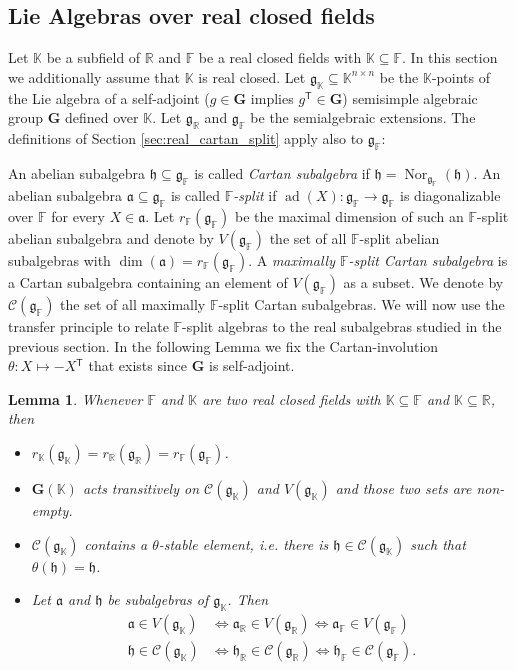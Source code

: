 \documentclass[12pt]{amsart}
\newcommand{\F}{\mathbb{F} }
\newcommand{\R}{\mathbb{R} }
\newcommand{\K}{\mathbb{K}}
\newcommand{\frakg}{\mathfrak{g}}
\newcommand{\fraka}{\mathfrak{a}}
\newcommand{\frakh}{\mathfrak{h}}
\newcommand{\bG}{\mathbf{G}}
\newcommand{\tran}{{^{\mathsf{T}}\!}}
\numberwithin{equation}{section}
\newtheorem{lemma}[theorem]{Lemma}
\theoremstyle{remark} %
\begin{document}
\subsection{Lie Algebras over real closed fields}

Let $\K$ be a subfield of $\R$ and $\F$ be a real closed fields with $\K \subseteq \F$. In this section we additionally assume that $\K$ is real closed. Let $\frakg_\K  \subseteq \K^{n\times n}$ be the $\K$-points of the Lie algebra of a self-adjoint ($g \in \bG$ implies $g\tran \in \bG$) semisimple algebraic group $\bG$ defined over $\K$. Let $\frakg_\R$ and $\frakg_\F$ be the semialgebraic extensions. The definitions of Section \ref{sec:real_cartan_split} apply also to $\frakg_\F$:

An abelian subalgebra $\frakh \subseteq \frakg_\F$ is called \emph{Cartan subalgebra} if $\frakh = \operatorname{Nor}_{\frakg_\F}(\frakh)$. An abelian subalgebra $\fraka \subseteq \frakg_\F$ is called \emph{$\F$-split} if $\operatorname{ad}(X) \colon \frakg_\F \to \frakg_\F$ is diagonalizable over $\F$ for every $X \in \fraka$. Let $r_{\F}(\frakg_\F)$ be the maximal dimension of such an $\F$-split abelian subalgebra and denote by $V(\frakg_\F)$ the set of all $\F$-split abelian subalgebras with $\dim(\fraka) = r_\F (\frakg_\F)$. A \emph{maximally $\F$-split Cartan subalgebra} is a Cartan subalgebra containing an element of $V(\frakg_\F)$ as a subset. We denote by $\mathcal{C}(\frakg_\F)$ the set of all maximally $\F$-split Cartan subalgebras. We will now use the transfer principle to relate $\F$-split algebras to the real subalgebras studied in the previous section. In the following Lemma we fix the Cartan-involution $\theta \colon X \mapsto -X\tran$ that exists since $\bG$ is self-adjoint.


\begin{lemma} \label{lem:3}
	Whenever $\F$ and $\K$ are two real closed fields with $\K \subseteq \F$ and $\K \subseteq \R$, then
	\begin{itemize}
		\item [(1)] $r_\K(\frakg_\K) = r_\R (\frakg_\R) =  r_\F (\frakg_\F)$.
		\item [(2)] $\bG(\K)$ acts transitively on $\mathcal{C}(\frakg_\K)$ and $V(\frakg_\K)$ and those two sets are non-empty.
		\item [(3)] \label{lem:3.3}$\mathcal{C}(\frakg_\K)$ contains a $\theta$-stable element, i.e. there is $\frakh \in \mathcal{C}(\frakg_\K)$ such that $\theta(\frakh) = \frakh$.
		\item [(4)] Let $\fraka$ and $\frakh$ be subalgebras of $\frakg_\K$. Then 
		\begin{align*}
			\fraka \in V(\frakg_\K) & \iff \fraka_\R \in V(\frakg_\R) \iff \fraka_\F \in V(\frakg_\F)
	\\
	\frakh \in \mathcal{C}(\frakg_\K) &\iff \frakh_\R \in \mathcal{C}(\frakg_\R) \iff \frakh_\F \in \mathcal{C}(\frakg_\F).	
	\end{align*}
	\end{itemize}
\end{lemma}
\end{document}
